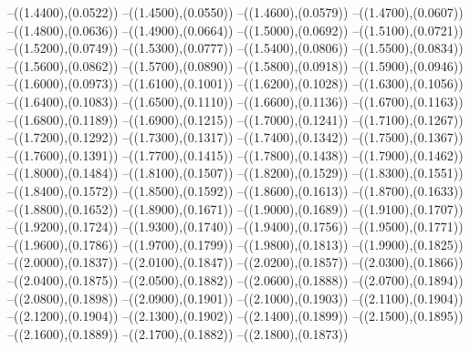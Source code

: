 {	--({\sx*(1.4400)},{\sy*(0.0522)})
	--({\sx*(1.4500)},{\sy*(0.0550)})
	--({\sx*(1.4600)},{\sy*(0.0579)})
	--({\sx*(1.4700)},{\sy*(0.0607)})
	--({\sx*(1.4800)},{\sy*(0.0636)})
	--({\sx*(1.4900)},{\sy*(0.0664)})
	--({\sx*(1.5000)},{\sy*(0.0692)})
	--({\sx*(1.5100)},{\sy*(0.0721)})
	--({\sx*(1.5200)},{\sy*(0.0749)})
	--({\sx*(1.5300)},{\sy*(0.0777)})
	--({\sx*(1.5400)},{\sy*(0.0806)})
	--({\sx*(1.5500)},{\sy*(0.0834)})
	--({\sx*(1.5600)},{\sy*(0.0862)})
	--({\sx*(1.5700)},{\sy*(0.0890)})
	--({\sx*(1.5800)},{\sy*(0.0918)})
	--({\sx*(1.5900)},{\sy*(0.0946)})
	--({\sx*(1.6000)},{\sy*(0.0973)})
	--({\sx*(1.6100)},{\sy*(0.1001)})
	--({\sx*(1.6200)},{\sy*(0.1028)})
	--({\sx*(1.6300)},{\sy*(0.1056)})
	--({\sx*(1.6400)},{\sy*(0.1083)})
	--({\sx*(1.6500)},{\sy*(0.1110)})
	--({\sx*(1.6600)},{\sy*(0.1136)})
	--({\sx*(1.6700)},{\sy*(0.1163)})
	--({\sx*(1.6800)},{\sy*(0.1189)})
	--({\sx*(1.6900)},{\sy*(0.1215)})
	--({\sx*(1.7000)},{\sy*(0.1241)})
	--({\sx*(1.7100)},{\sy*(0.1267)})
	--({\sx*(1.7200)},{\sy*(0.1292)})
	--({\sx*(1.7300)},{\sy*(0.1317)})
	--({\sx*(1.7400)},{\sy*(0.1342)})
	--({\sx*(1.7500)},{\sy*(0.1367)})
	--({\sx*(1.7600)},{\sy*(0.1391)})
	--({\sx*(1.7700)},{\sy*(0.1415)})
	--({\sx*(1.7800)},{\sy*(0.1438)})
	--({\sx*(1.7900)},{\sy*(0.1462)})
	--({\sx*(1.8000)},{\sy*(0.1484)})
	--({\sx*(1.8100)},{\sy*(0.1507)})
	--({\sx*(1.8200)},{\sy*(0.1529)})
	--({\sx*(1.8300)},{\sy*(0.1551)})
	--({\sx*(1.8400)},{\sy*(0.1572)})
	--({\sx*(1.8500)},{\sy*(0.1592)})
	--({\sx*(1.8600)},{\sy*(0.1613)})
	--({\sx*(1.8700)},{\sy*(0.1633)})
	--({\sx*(1.8800)},{\sy*(0.1652)})
	--({\sx*(1.8900)},{\sy*(0.1671)})
	--({\sx*(1.9000)},{\sy*(0.1689)})
	--({\sx*(1.9100)},{\sy*(0.1707)})
	--({\sx*(1.9200)},{\sy*(0.1724)})
	--({\sx*(1.9300)},{\sy*(0.1740)})
	--({\sx*(1.9400)},{\sy*(0.1756)})
	--({\sx*(1.9500)},{\sy*(0.1771)})
	--({\sx*(1.9600)},{\sy*(0.1786)})
	--({\sx*(1.9700)},{\sy*(0.1799)})
	--({\sx*(1.9800)},{\sy*(0.1813)})
	--({\sx*(1.9900)},{\sy*(0.1825)})
	--({\sx*(2.0000)},{\sy*(0.1837)})
	--({\sx*(2.0100)},{\sy*(0.1847)})
	--({\sx*(2.0200)},{\sy*(0.1857)})
	--({\sx*(2.0300)},{\sy*(0.1866)})
	--({\sx*(2.0400)},{\sy*(0.1875)})
	--({\sx*(2.0500)},{\sy*(0.1882)})
	--({\sx*(2.0600)},{\sy*(0.1888)})
	--({\sx*(2.0700)},{\sy*(0.1894)})
	--({\sx*(2.0800)},{\sy*(0.1898)})
	--({\sx*(2.0900)},{\sy*(0.1901)})
	--({\sx*(2.1000)},{\sy*(0.1903)})
	--({\sx*(2.1100)},{\sy*(0.1904)})
	--({\sx*(2.1200)},{\sy*(0.1904)})
	--({\sx*(2.1300)},{\sy*(0.1902)})
	--({\sx*(2.1400)},{\sy*(0.1899)})
	--({\sx*(2.1500)},{\sy*(0.1895)})
	--({\sx*(2.1600)},{\sy*(0.1889)})
	--({\sx*(2.1700)},{\sy*(0.1882)})
	--({\sx*(2.1800)},{\sy*(0.1873)})
}
